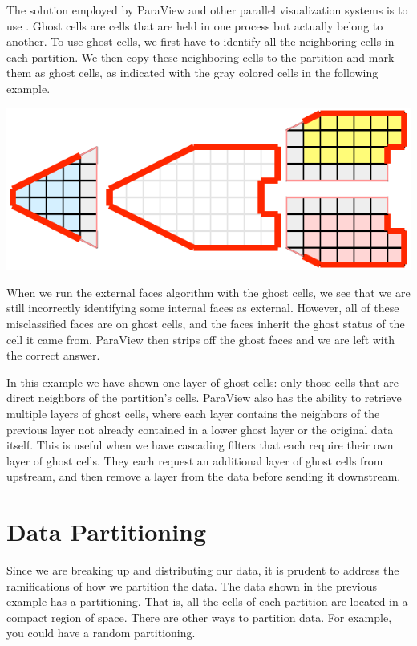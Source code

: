 The solution employed by ParaView and other parallel visualization systems
is to use .  Ghost cells are cells that are held in
one process but actually belong to another.  To use ghost cells, we first
have to identify all the neighboring cells in each partition.  We then copy
these neighboring cells to the partition and mark them as ghost cells, as
indicated with the gray colored cells in the following example.

\begin{inlinefig}
  \includegraphics[scale=\bbscale]{images/ParallelExampleExternalFaces2}
\end{inlinefig}

When we run the external faces algorithm with the ghost cells, we see that
we are still incorrectly identifying some internal faces as external.
However, all of these misclassified faces are on ghost cells, and the faces
inherit the ghost status of the cell it came from.  ParaView then strips
off the ghost faces and we are left with the correct answer.

In this example we have shown one layer of ghost cells: only those cells
that are direct neighbors of the partition’s cells.  ParaView also has the
ability to retrieve multiple layers of ghost cells, where each layer
contains the neighbors of the previous layer not already contained in a
lower ghost layer or the original data itself.  This is useful when we have
cascading filters that each require their own layer of ghost cells.  They
each request an additional layer of ghost cells from upstream, and then
remove a layer from the data before sending it downstream.

\section{Data Partitioning}

Since we are breaking up and distributing our data, it is prudent to
address the ramifications of how we partition the data.  The data shown in
the previous example has a  partitioning.  That
is, all the cells of each partition are located in a compact region of
space.  There are other ways to partition data.  For example, you could
have a random partitioning.

